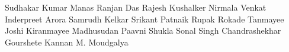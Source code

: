 Sudhakar Kumar
Manas Ranjan Das
Rajesh Kushalker
Nirmala Venkat
Inderpreet Arora
Samrudh Kelkar
Srikant Patnaik
Rupak Rokade
Tanmayee Joshi
Kiranmayee Madhusudan
Paavni Shukla
Sonal Singh
Chandrashekhar Gourshete
Kannan M. Moudgalya

